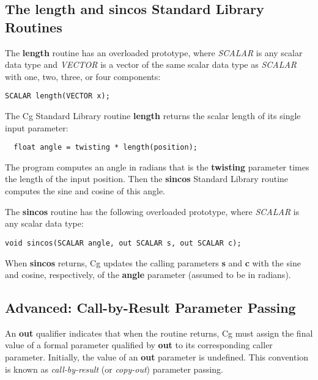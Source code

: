\documentclass[../main.tex]{subfiles}
\begin{document}
\subsection*{The length and sincos Standard Library Routines}

The \textbf{length} routine has an overloaded prototype, where \textit{SCALAR} is any scalar data type and \textit{VECTOR} is a vector of the same scalar data type as \textit{SCALAR} with one, two, three, or four components:

\FloatBarrier
\begin{lstlisting}
SCALAR length(VECTOR x);
\end{lstlisting}
\FloatBarrier

The Cg Standard Library routine \textbf{length} returns the scalar length of its single input parameter:

\FloatBarrier
\begin{lstlisting}
  float angle = twisting * length(position);
\end{lstlisting}
\FloatBarrier

The program computes an angle in radians that is the \textbf{twisting} parameter times the length of the input position. Then the \textbf{sincos} Standard Library routine computes the sine and cosine of this angle.

The \textbf{sincos} routine has the following overloaded prototype, where \textit{SCALAR} is any scalar data type:

\FloatBarrier
\begin{lstlisting}
void sincos(SCALAR angle, out SCALAR s, out SCALAR c);
\end{lstlisting}
\FloatBarrier

When \textbf{sincos} returns, Cg updates the calling parameters \textbf{s} and \textbf{c} with the sine and cosine, respectively, of the \textbf{angle} parameter (assumed to be in radians).

\subsection*{Advanced: Call-by-Result Parameter Passing}

An \textbf{out} qualifier indicates that when the routine returns, Cg must assign the final value of a formal parameter qualified by \textbf{out} to its corresponding caller parameter. Initially, the value of an \textbf{out} parameter is undefined. This convention is known as \textit{call-by-result} (or \textit{copy-out}) parameter passing.
\end{document}
